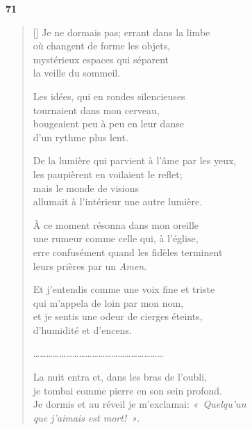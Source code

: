 \documentclass[a4paper,12pt]{book}
\begin{document}
\bigskip

\begin{center}
  \textbf{71}
\end{center}


\begin{verse}[\versewidth]
  Je ne dormais pas; errant dans la limbe \\
  où changent de forme les objets, \\
  mystérieux espaces qui séparent \\
  la veille du sommeil.

  Les idées, qui en rondes silencieuses \\
  tournaient dans mon cerveau, \\
  bougeaient peu à peu en leur danse \\
  d'un rythme plus lent.

  De la lumière qui parvient à l'âme par les yeux, \\
  les paupièrent en voilaient le reflet; \\
  mais le monde de visions \\
  allumait à l'intérieur une autre lumière.

  À ce moment résonna dans mon oreille \\
  une rumeur comme celle qui, à l'église, \\
  erre confusément quand les fidèles terminent \\
  leurs prières par un \emph{Amen}.

  Et j'entendis comme une voix fine et triste \\
  qui m'appela de loin par mon nom, \\
  et je sentis une odeur de cierges éteints, \\
  d'humidité et d'encens.

\ldots\ldots\ldots\ldots\ldots\ldots\ldots\ldots\ldots\ldots\ldots\ldots\ldots\ldots\ldots\ldots\ldots\ldots\ldots\ldots

  La nuit entra et, dans les bras de l'oubli, \\
  je tombai comme pierre en son sein profond. \\
  Je dormis et au réveil je m'exclamai: \emph{«~Quelqu'un \\
que j'aimais est mort!~»}.
\end{verse}
\end{document}
